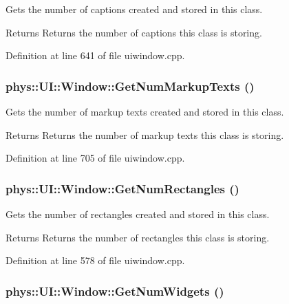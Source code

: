 Gets the number of captions created and stored in this class. 

\begin{DoxyReturn}{Returns}
Returns the number of captions this class is storing. 
\end{DoxyReturn}


Definition at line 641 of file uiwindow.cpp.

\hypertarget{classphys_1_1UI_1_1Window_ac9e23e41ffff8ef475fcdb0c25bad240}{
\subsubsection[{GetNumMarkupTexts}]{ phys::UI::Window::GetNumMarkupTexts ()}}
\label{d4/d86/classphys_1_1UI_1_1Window_ac9e23e41ffff8ef475fcdb0c25bad240}


Gets the number of markup texts created and stored in this class. 

\begin{DoxyReturn}{Returns}
Returns the number of markup texts this class is storing. 
\end{DoxyReturn}


Definition at line 705 of file uiwindow.cpp.

\hypertarget{classphys_1_1UI_1_1Window_a4d2d8821df32a920e7389b37f50f7c6d}{
\subsubsection[{GetNumRectangles}]{ phys::UI::Window::GetNumRectangles ()}}
\label{d4/d86/classphys_1_1UI_1_1Window_a4d2d8821df32a920e7389b37f50f7c6d}


Gets the number of rectangles created and stored in this class. 

\begin{DoxyReturn}{Returns}
Returns the number of rectangles this class is storing. 
\end{DoxyReturn}


Definition at line 578 of file uiwindow.cpp.

\hypertarget{classphys_1_1UI_1_1Window_a062270984d25dca44f0bc4d65ef324a0}{
\subsubsection[{GetNumWidgets}]{ phys::UI::Window::GetNumWidgets ()}}
\label{d4/d86/classphys_1_1UI_1_1Window_a062270984d25dca44f0bc4d65ef324a0}


